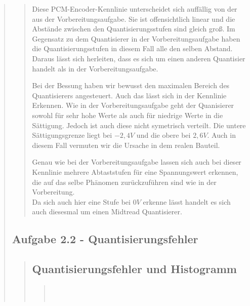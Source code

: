 \begin{quote}
\begin{quote}
        Diese PCM-Encoder-Kennlinie unterscheidet sich auffällig von der aus der Vorbereitungsaufgabe.
        Sie ist offensichtlich linear und die Abstände zwischen den Quantisierungsstufen sind gleich groß. Im Gegensatz
        zu dem Quantisierer in der Vorbereitungsaufgabe haben die Quantisierungsstufen in diesem Fall alle den selben
        Abstand. Daraus lässt sich herleiten, dass es sich um einen anderen Quantisier handelt als in der
        Vorbereitungsaufgabe.\vspace{1em}
        
        Bei der Bessung haben wir bewusst den maximalen Bereich des Quantisierers angesteuert. Auch das lässt sich in
        der Kennlinie Erkennen. Wie in der Vorbereitungsaufgabe geht der Quanisierer sowohl für sehr hohe Werte als auch
        für niedrige Werte in die Sättigung. Jedoch ist auch diese nicht symetrisch verteilt. Die untere
        Sättigungsgrenze liegt bei $-2,4 V$ und die obere bei $2,6 V$. Auch in diesem Fall vermuten wir die Ursache in
        dem realen Bauteil.\vspace{1em}
        
        Genau wie bei der Vorbereitungsaufgabe lassen sich auch bei dieser Kennlinie mehrere Abtaststufen für eine
        Spannungswert erkennen, die auf das selbe Phänomen zurückzuführen sind wie in der Vorbereitung.\\
        Da sich auch hier eine Stufe bei $0 V$ erkenne lässt handelt es sich auch diesesmal um einen Midtread
        Quantisierer.\vspace{1em}
        
        
    \end{quote}  %
    
    \subsection{Aufgabe 2.2 - Quantisierungsfehler}
    \begin{quote}
    
        \subsection{Quantisierungsfehler und Histogramm}
        \begin{quote}
    
             \\
            
            \begin{center}
                \begin{tabular}{ll}
                

\end{tabular}
\end{center}
\end{quote}
\end{quote}
\end{quote}

